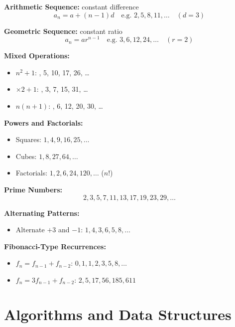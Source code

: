 \documentclass{article}
\begin{document}
\begin{tcolorbox}[colback=white,colframe=black,title={Common Sequences in Quantitative Reasoning}]
\textbf{Arithmetic Sequence:} constant difference  
\[
a_n = a + (n-1)d \quad \text{e.g. } 2, 5, 8, 11, \ldots \quad (d = 3)
\]

\textbf{Geometric Sequence:} constant ratio  
\[
a_n = ar^{n-1} \quad \text{e.g. } 3, 6, 12, 24, \ldots \quad (r = 2)
\]

\textbf{Mixed Operations:}  
\begin{itemize}
  \item $n^2 + 1$: , 5, 10, 17, 26, \ldots
  \item $\times 2 + 1$: , 3, 7, 15, 31, \ldots
  \item $n(n+1)$: , 6, 12, 20, 30, \ldots
\end{itemize}

\textbf{Powers and Factorials:}
\begin{itemize}
  \item Squares: \quad $1, 4, 9, 16, 25, \ldots$
  \item Cubes: \quad $1, 8, 27, 64, \ldots$
  \item Factorials: \quad $1, 2, 6, 24, 120, \ldots$ ($n!$)
\end{itemize}

\textbf{Prime Numbers:}  
\[
2, 3, 5, 7, 11, 13, 17, 19, 23, 29, \ldots
\]

\textbf{Alternating Patterns:}
\begin{itemize}
  \item Alternate $+3$ and $-1$: \quad $1, 4, 3, 6, 5, 8, \ldots$
\end{itemize}

\textbf{Fibonacci-Type Recurrences:}
\begin{itemize}
  \item $f_n = f_{n-1} + f_{n-2}$: \quad $0, 1, 1, 2, 3, 5, 8, \ldots$
  \item $f_n = 3f_{n-1} + f_{n-2}$: \quad $2, 5, 17, 56, 185, 611$
\end{itemize}
\end{tcolorbox}


\newpage
\section{Algorithms and Data Structures}
\newpage
\nocite{*}

 
\end{document}
